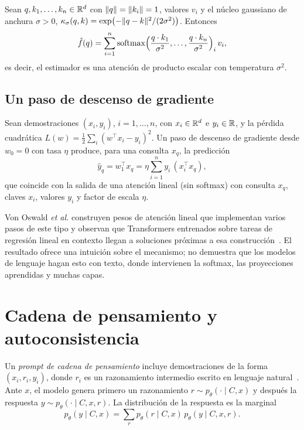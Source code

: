 \begin{proposicion}\label{prop:nw-esfera}
Sean $q,k_1,\dots,k_n\in\mathbb{R}^{d}$ con $\lVert q\rVert=\lVert k_i\rVert=1$, valores $v_i$ y el núcleo gaussiano de anchura $\sigma>0$, $\kappa_\sigma(q,k)=\exp\bigl(-\lVert q-k\rVert^{2}/(2\sigma^{2})\bigr)$. Entonces
\[
\hat f(q)=\sum_{i=1}^{n}\operatorname{softmax}\Bigl(\frac{q\cdot k_1}{\sigma^{2}},\dots,\frac{q\cdot k_n}{\sigma^{2}}\Bigr)_i\,v_i ,
\]
es decir, el estimador es una atención de producto escalar con temperatura $\sigma^{2}$.
\end{proposicion}

\addtocounter{definicion}{1}%

\subsection{Un paso de descenso de gradiente}

\begin{teorema}\label{teo:icl-gd}
Sean demostraciones $(x_i,y_i)$, $i=1,\dots,n$, con $x_i\in\mathbb{R}^{d}$ e $y_i\in\mathbb{R}$, y la pérdida cuadrática $L(w)=\tfrac12\sum_i(w^{\top}x_i-y_i)^{2}$. Un paso de descenso de gradiente desde $w_0=0$ con tasa $\eta$ produce, para una consulta $x_q$, la predicción
\[
\hat y_q=w_1^{\top}x_q=\eta\sum_{i=1}^{n}y_i\,(x_i^{\top}x_q),
\]
que coincide con la salida de una atención lineal (sin softmax) con consulta $x_q$, claves $x_i$, valores $y_i$ y factor de escala $\eta$.
\end{teorema}

\addtocounter{definicion}{1}%

\begin{observacion}
Von Oswald \emph{et al.} construyen pesos de atención lineal que implementan varios pasos de este tipo y observan que Transformers entrenados sobre tareas de regresión lineal en contexto llegan a soluciones próximas a esa construcción~\cite{vonoswald}. El resultado ofrece una intuición sobre el mecanismo; no demuestra que los modelos de lenguaje hagan esto con texto, donde intervienen la softmax, las proyecciones aprendidas y muchas capas.
\end{observacion}

\section{Cadena de pensamiento y autoconsistencia}

\begin{definicion}\label{def:cot}
Un \emph{prompt de cadena de pensamiento} incluye demostraciones de la forma $(x_i,r_i,y_i)$, donde $r_i$ es un razonamiento intermedio escrito en lenguaje natural~\cite{wei-cot}. Ante $x$, el modelo genera primero un razonamiento $r\sim p_\theta(\cdot\mid C,x)$ y después la respuesta $y\sim p_\theta(\cdot\mid C,x,r)$. La distribución de la respuesta es la marginal
\[
p_\theta(y\mid C,x)=\sum_{r}p_\theta(r\mid C,x)\,p_\theta(y\mid C,x,r).
\]
\end{definicion}

